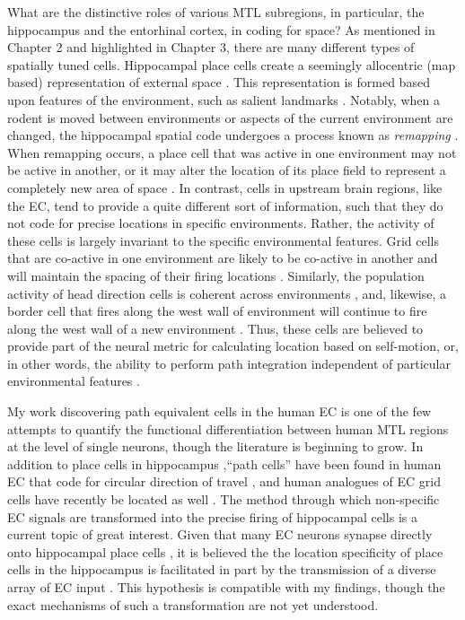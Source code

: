 What are the distinctive roles of various MTL subregions, in particular, the hippocampus and the entorhinal cortex, in coding for space? As mentioned in Chapter 2 and highlighted in Chapter 3, there are many different types of spatially tuned cells. Hippocampal place cells create a seemingly allocentric (map based) representation of external space \citep{OKeeDost71,Mull96}. This representation is formed based upon features of the environment, such as salient landmarks \citep{OKeeBurg96}. Notably, when a rodent is moved between environments or aspects of the current environment are changed, the hippocampal spatial code undergoes a process known as \textit{remapping} \citep{MullKubi87}. When remapping occurs, a place cell that was active in one environment may not be active in another, or it may alter the location of its place field to represent a completely new area of space \citep{MarkEtal95a,LeutEtal04a,LeutEtal05}. In contrast, cells in upstream brain regions, like the EC, tend to provide a quite different sort of information, such that they do not code for precise locations in specific environments. Rather, the activity of these cells is largely invariant to the specific environmental features. Grid cells that are co-active in one environment are likely to be co-active in another and will maintain the spacing of their firing locations \citep{FyhnEtal07}. Similarly, the population activity of head direction cells is coherent across environments \citep{TaubEtal90}, and, likewise, a border cell that fires along the west wall of environment will continue to fire along the west wall of a new environment \citep{SolsEtal08}. Thus, these cells are believed to provide part of the neural metric for calculating location based on self-motion, or, in other words, the ability to perform path integration independent of particular environmental features \citep{JeffBurg06,BuzsMose13}.

My work discovering path equivalent cells in the human EC is one of the few attempts to quantify the functional differentiation between human MTL regions at the level of single neurons, though the literature is beginning to grow. In addition to place cells in hippocampus \citep{EkstEtal03},``path cells'' have been found in human EC that code for circular direction of travel \citep{JacoEtal10}, and human analogues of EC grid cells have recently be located as well \citep{JacoEtal13}. The method through which non-specific EC signals are transformed into the precise firing of hippocampal cells is a current topic of great interest. Given that many EC neurons synapse directly onto hippocampal place cells \citep{ZhanEtal13}, it is believed the the location specificity of place cells in the hippocampus is facilitated in part by the transmission of a diverse array of EC input \citep{MoseMose13}. This hypothesis is  compatible with my findings, though the exact mechanisms of such a transformation are not yet understood.

